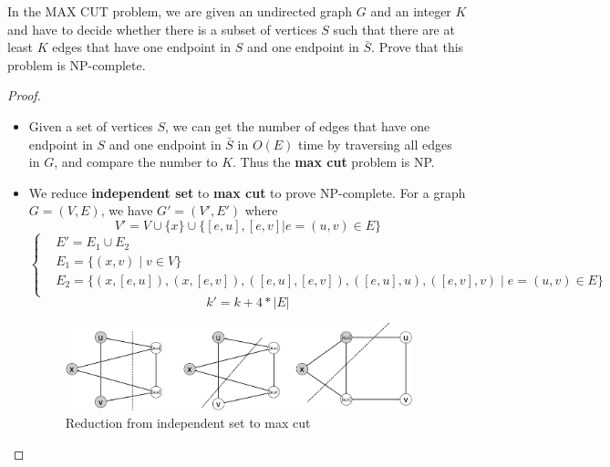 \documentclass{article}
\newcounter{exercise}
\newcommand{\<}{
    \langle}
\renewcommand{\>}{
    \rangle}
\begin{document}
{\begin{exercise}
In the \textsf{MAX CUT} problem, we are given an undirected graph $G$ and an integer $K$ and have to decide whether there is a subset of vertices $S$ such that there are at least $K$ edges that have one endpoint in $S$ and one endpoint in $\bar{S}$. Prove that this problem is NP-complete.
\end{exercise}
\begin{proof}
    \leavevmode\newline
    \begin{itemize}
        \item Given a set of vertices $S$, we can get the number of edges that have one endpoint in $S$ and one endpoint in $\bar{S}$ in $O(E)$ time by traversing all edges in $G$, and compare the number to $K$. Thus the \textbf{max cut} problem is NP.
        \item We reduce \textbf{independent set} to \textbf{max cut} to prove NP-complete. For a graph $G=(V,E)$, we have $G'=(V',E')$ where
        \begin{displaymath}
            V'=V\cup \{x\}\cup \{[e,u],[e,v]|e=(u,v)\in E\}
        \end{displaymath}
        \begin{displaymath}
            \left\{
            \begin{aligned}
                & E'=E_1\cup E_2& \\
                & E_1=\{(x,v)\mid v\in V\}& \\
                & E_2=\{(x,[e,u]),(x,[e,v]),([e,u],[e,v]),([e,u],u),([e,v],v)\mid e=(u,v)\in E\} & \\
            \end{aligned}
            \right.
        \end{displaymath}
        \begin{displaymath}
            k'=k+4*|E|
        \end{displaymath}
\begin{figure}[!htp]
    \centering
    \includegraphics[width=0.95\textwidth]{img/7.jpg}
    \caption{Reduction from independent set to max cut}
    \label{ttt}
\end{figure}


\end{itemize}
\end{proof}}
\end{document}

